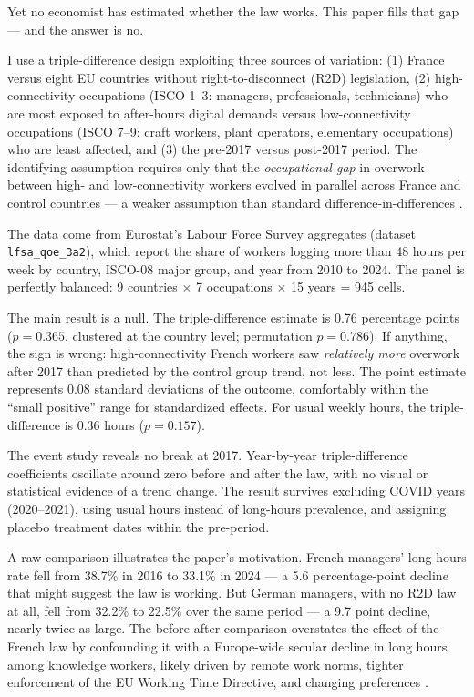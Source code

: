 \documentclass[12pt]{article}
\begin{document}
Yet no economist has estimated whether the law works. This paper fills that gap --- and the answer is no.

I use a triple-difference design exploiting three sources of variation: (1) France versus eight EU countries without right-to-disconnect (R2D) legislation, (2) high-connectivity occupations (ISCO 1--3: managers, professionals, technicians) who are most exposed to after-hours digital demands versus low-connectivity occupations (ISCO 7--9: craft workers, plant operators, elementary occupations) who are least affected, and (3) the pre-2017 versus post-2017 period. The identifying assumption requires only that the \textit{occupational gap} in overwork between high- and low-connectivity workers evolved in parallel across France and control countries --- a weaker assumption than standard difference-in-differences \citep{gruber1994incidence, olden2022triple}.

The data come from Eurostat's Labour Force Survey aggregates (dataset \texttt{lfsa\_qoe\_3a2}), which report the share of workers logging more than 48 hours per week by country, ISCO-08 major group, and year from 2010 to 2024. The panel is perfectly balanced: 9 countries $\times$ 7 occupations $\times$ 15 years = 945 cells.

The main result is a null. The triple-difference estimate is 0.76 percentage points ($p = 0.365$, clustered at the country level; permutation $p = 0.786$). If anything, the sign is wrong: high-connectivity French workers saw \textit{relatively more} overwork after 2017 than predicted by the control group trend, not less. The point estimate represents 0.08 standard deviations of the outcome, comfortably within the ``small positive'' range for standardized effects. For usual weekly hours, the triple-difference is 0.36 hours ($p = 0.157$).

The event study reveals no break at 2017. Year-by-year triple-difference coefficients oscillate around zero before and after the law, with no visual or statistical evidence of a trend change. The result survives excluding COVID years (2020--2021), using usual hours instead of long-hours prevalence, and assigning placebo treatment dates within the pre-period.

A raw comparison illustrates the paper's motivation. French managers' long-hours rate fell from 38.7\% in 2016 to 33.1\% in 2024 --- a 5.6 percentage-point decline that might suggest the law is working. But German managers, with no R2D law at all, fell from 32.2\% to 22.5\% over the same period --- a 9.7 point decline, nearly twice as large. The before-after comparison overstates the effect of the French law by confounding it with a Europe-wide secular decline in long hours among knowledge workers, likely driven by remote work norms, tighter enforcement of the EU Working Time Directive, and changing preferences \citep{eurofound2022telework, messenger2018working}.
\end{document}
